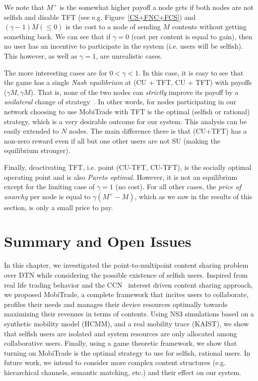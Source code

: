 We note that $M^{+}$ is the somewhat higher payoff a node gets if both nodes are not selfish and disable TFT (see e.g. Figure~\ref{CS+FNC+FCS}) and $(\gamma - 1)M (\le 0)$ is the cost to a node of sending $M$ contents without getting something back. We can see that if $\gamma = 0$ (cost per content is equal to gain), then no user has an incentive to participate in the system (i.e. users will be selfish). This however, as well as $\gamma = 1$, are unrealistic cases.

The more interesting cases are for $0 < \gamma < 1$. In this case, it is easy to see that the game has a single \emph{Nash equilibrium} at (CU + TFT, CU + TFT) with payoffs ($\gamma M, \gamma M$). That is, none of the two nodes can \emph{strictly} improve its payoff by a \emph{unilateral} change of strategy~\cite{game}. In other words, for nodes participating in our network choosing to use MobiTrade with TFT is the optimal (selfish or rational) strategy, which is a very desirable outcome for our system. This analysis can be easily extended to $N$ nodes. The main difference there is that (CU+TFT) has a non-zero reward even if all but one other users are not SU (making the equilibrium stronger).

Finally, deactivating TFT, i.e. point (CU-TFT, CU-TFT), is the socially optimal operating point and is also \emph{Pareto optimal}. However, it is not an equilibrium except for the limiting case of $\gamma = 1$ (no cost). For all other cases, the \emph{price of anarchy} per node is equal to $\gamma (M^{+} - M)$, which as we saw in the results of this section, is only a small price to pay.

\section{Summary and Open Issues}
\label{MobiTrade-conclusion}

In this chapter, we investigated the point-to-multipoint content sharing problem over DTN while considering the possible existence of selfish users. Inspired from real life trading behavior and the CCN~\cite{CCN} interest driven content sharing approach, we proposed MobiTrade, a complete framework that incites users to collaborate, profiles their needs and manages their device resources optimally towards maximizing their revenues in terms of contents. Using NS3 simulations based on a synthetic mobility model (HCMM), and a real mobility trace (KAIST), we show that selfish users are isolated and system resources are only allocated among collaborative users. Finally, using a game theoretic framework, we show that turning on MobiTrade is the optimal strategy to use for selfish, rational users. In future work, we intend to consider more complex content structures (e.g. hierarchical channels, semantic matching, etc.) and their effect on our system.

